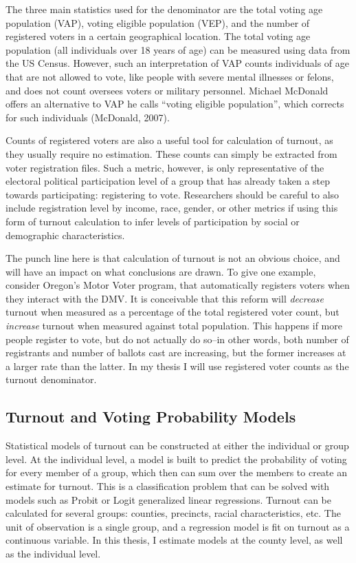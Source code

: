 \documentclass[12pt,twoside]{reedthesis}
\begin{document}
  The three main statistics used for the denominator are the total voting
  age population (VAP), voting eligible population (VEP), and the number
  of registered voters in a certain geographical location. The total
  voting age population (all individuals over 18 years of age) can be
  measured using data from the US Census. However, such an interpretation
  of VAP counts individuals of age that are not allowed to vote, like
  people with severe mental illnesses or felons, and does not count
  oversees voters or military personnel. Michael McDonald offers an
  alternative to VAP he calls ``voting eligible population'', which
  corrects for such individuals (McDonald, 2007).
  
  Counts of registered voters are also a useful tool for calculation of
  turnout, as they usually require no estimation. These counts can simply
  be extracted from voter registration files. Such a metric, however, is
  only representative of the electoral political participation level of a
  group that has already taken a step towards participating: registering
  to vote. Researchers should be careful to also include registration
  level by income, race, gender, or other metrics if using this form of
  turnout calculation to infer levels of participation by social or
  demographic characteristics.
  
  The punch line here is that calculation of turnout is not an obvious
  choice, and will have an impact on what conclusions are drawn. To give
  one example, consider Oregon's Motor Voter program, that automatically
  registers voters when they interact with the DMV. It is conceivable that
  this reform will \emph{decrease} turnout when measured as a percentage
  of the total registered voter count, but \emph{increase} turnout when
  measured against total population. This happens if more people register
  to vote, but do not actually do so--in other words, both number of
  registrants and number of ballots cast are increasing, but the former
  increases at a larger rate than the latter. In my thesis I will use
  registered voter counts as the turnout denominator.
  
  \subsection{Turnout and Voting Probability
  Models}\label{turnout-and-voting-probability-models}
  
  Statistical models of turnout can be constructed at either the
  individual or group level. At the individual level, a model is built to
  predict the probability of voting for every member of a group, which
  then can sum over the members to create an estimate for turnout. This is
  a classification problem that can be solved with models such as Probit
  or Logit generalized linear regressions. Turnout can be calculated for
  several groups: counties, precincts, racial characteristics, etc. The
  unit of observation is a single group, and a regression model is fit on
  turnout as a continuous variable. In this thesis, I estimate models at
  the county level, as well as the individual level.
  
\end{document}
